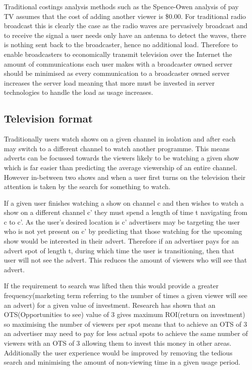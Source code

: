 Traditional costings analysis methods such as the Spence-Owen analysis of pay TV assumes that the cost of adding another viewer is \$0.00\citet{broadcastEconomics}. For traditional radio broadcast this is clearly the case as the radio waves are pervasively broadcast and to receive the signal a user needs only have an antenna to detect the waves, there is nothing sent back to the broadcaster, hence no additional load. Therefore to enable broadcasters to economically transmit television over the Internet the amount of communications each user makes with a broadcaster owned server should be minimised as every communication to a broadcaster owned server increases the server load meaning that more must be invested in server technologies to handle the load as usage increases.

\subsection{Television format}
Traditionally users watch shows on a given channel in isolation and after each may switch to a different channel to watch another programme. This means adverts can be focussed towards the viewers likely to be watching a given show which is far easier than predicting the average viewership of an entire channel. However in-between two shows and when a user first turns on the television their attention is taken by the search for something to watch.

If a given user finishes watching a show on channel c and then wishes to watch a show on a different channel c' they must spend a length of time t navigating from c to c'. As the user's desired location is c' advertisers may be targeting the user who is not yet present on c' by predicting that those watching for the upcoming show would be interested in their advert. Therefore if an advertiser pays for an advert spot of length t, during which time the user is transitioning, then that user will not see the advert. This reduces the amount of viewers who will see that advert.

If the requirement to search was lifted then this would provide a greater frequency(marketing term referring to the number of times a given viewer will see an advert) for a given value of investment. Research has shown that an OTS(Opportunities to see) value of 3 gives maximum ROI(return on investment) so maximising the number of viewers per spot means that to achieve an OTS of 3 an advertiser may need to pay for less actual spots to achieve the same number of viewers with an OTS of 3 allowing them to invest this money in other areas. Additionally the user experience would be improved by removing the tedious search and minimising the amount of non-viewing time in a given usage period.

